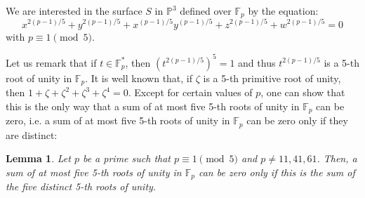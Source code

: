 \documentclass[12pt]{amsart}
\newtheorem{lemma}{Lemma}[section]
\theoremstyle{definition}
\begin{document}
We are interested in the surface
 $S$ in ${\mathbb P}^3$ defined over ${\mathbb F}_p$  by the equation:
$$x^{2(p-1)/5} + y^{2(p-1)/5} + x^{(p-1)/5} y^{(p-1)/5}+z^{2(p-1)/5}  + w^{2(p-1)/5}=0$$
with $p\equiv 1\pmod 5$.

Let us remark that if $t\in{\mathbb F}_p^{\ast}$, then $(t^{2(p-1)/5})^5=1$ and thus $t^{2(p-1)/5}$ is a 5-th root of unity in ${\mathbb F}_p$.
It is well known that, if $\zeta$ is a 5-th primitive root of unity, then $1+\zeta+\zeta^2+\zeta^3+\zeta^4=0$.
Except for certain values of $p$, one can show that 
this is the only way that
a sum of at most five 5-th roots of unity in ${\mathbb F}_p$ can be zero,
i.e.
a sum of at most five 5-th roots of unity in ${\mathbb F}_p$ can be zero
 only if they are distinct:

\begin{lemma}\label{sum_roots}
Let $p$ be a prime such that $p\equiv 1\pmod 5$ and $p\not=11, 41, 61$.
Then, a sum of at most five 5-th roots of unity in ${\mathbb F}_p$ can be zero only if 
this is the sum of the five distinct 5-th roots of unity.
\end{lemma}
\end{document}
